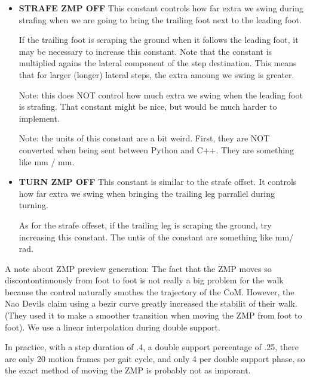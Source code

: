 \documentclass[11pt]{article}
\begin{document}
\begin{itemize}
\item {\bf STRAFE ZMP OFF} This constant controls how far extra we swing
during strafing when we are going to bring the trailing foot next to the
leading foot. 

If the trailing foot is scraping the ground when it follows the leading foot,
it may be necessary to increase this constant.  Note that the constant is
multiplied agains the lateral component of the step destination. This means
that for larger (longer) lateral steps, the extra amoung we swing is greater.

Note: this does NOT control how much extra we swing when the leading foot
is strafing. That constant might be nice, but would be much harder to
implement.

Note: the units of this constant are a bit weird. First, they are NOT converted
when being sent between Python and C++. They are something like
mm / mm.
\item {\bf TURN ZMP OFF} This constant is similar to the strafe offset. It
controls how far extra we swing when bringing the trailing leg parrallel
during turning.

As for the strafe offeset, if the trailing leg is scraping the ground,
try increasing this constant.  The untis of the constant are something like mm/ rad.

\end{itemize}

A note about ZMP preview generation:  The fact that the ZMP moves so
discontontinuously from foot to foot is not really a big problem for the walk
because the control naturally smothes the trajectory of the CoM. However,
the Nao Devils claim using a bezir curve greatly increased the stabilit of
their walk. (They used it to make a smoother transition when moving the ZMP
from foot to foot).  We use  a linear interpolation during double support.

In practice, with a step duration of .4, a double support percentage of .25,
there are only 20 motion frames per gait cycle, and only 4 per double support
phase, so the exact method of moving the ZMP is probably not as imporant.
\end{document}
